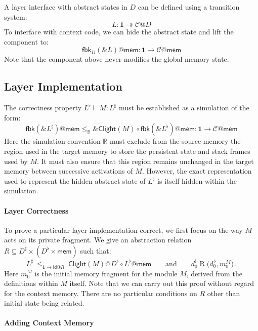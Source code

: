 \documentclass[acmsmall,screen,review,anonymous]{acmart}
\newcommand{\kw}[1]{\ensuremath{ \mathsf{#1} }}
\begin{document}
A layer interface with abstract states in $D$
can be defined using a transition system:
\[
  L : \mathbf{1} \twoheadrightarrow \mathcal{C}@D
\]
To interface with context code,
we can hide the abstract state and lift the component to:
\[
  \kw{fbk}_D(\&L)@\kw{mem} : \mathbf{1} \rightarrow \mathcal{C}@\kw{mem}
\]
Note that the component above never modifies the global memory state.


\subsection{Layer Implementation} %

The correctness property $L^\flat \vdash M : L^\sharp$
must be established as a simulation of the form:
\[
  \kw{fbk}(\&L^\sharp)@\kw{mem}
  \le_\mathbb{R}
  \&\kw{Clight}(M) \circ \kw{fbk}(\&L^\flat)@\kw{mem}
  :
  \mathbf{1} \rightarrow \mathcal{C}@\kw{mem}
\]
Here the simulation convention $\mathbb{R}$
must exclude from the source memory
the region used in the target memory
to store the persistent state and stack frames used by $M$.
It must also ensure that
this region remains unchanged in the target memory
between successive activations of $M$.
However,
the exact representation used
to represent the hidden abstract state of $L^\sharp$
is itself hidden within the simulation.

\paragraph{Layer Correctness}

To prove a particular layer implementation correct,
we first focus on the way $M$ acts on its private fragment.
We give an abstraction relation
$R \subseteq D^\sharp \times (D^\flat \times \kw{mem})$
such that:
\begin{equation}
  L^\sharp
  \:\le_{\mathbf{1} \rightarrow \kw{id}@R}\:
  \kw{Clight}(M)@D^\flat \circ L^\flat@\kw{mem}
  \qquad \text{and} \qquad
  d^\sharp_0 \mathrel{R} \big( d^{\,\flat}_0, m_0^M \big)
  \,.
  \label{eqn:lc}
\end{equation}
Here $m_0^M$ is the initial memory fragment for the module $M$,
derived from the definitions within $M$ itself.
Note that we can carry out this proof without regard for the context memory.
There are no particular conditions on $R$ other than
initial state being related.

\paragraph{Adding Context Memory}
\end{document}
